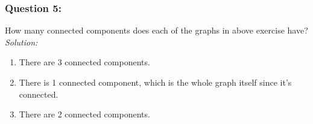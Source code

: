 \documentclass[a4paper]{article}
\begin{document}
	
	\subsubsection*{Question 5:}
	How many connected components does each of the graphs in above exercise have?\\
	\textit{Solution:}
	\begin{enumerate}[label = \alph*)]
	    \item 
	    There are 3 connected components.
	    \item 
	    There is 1 connected component, which is the whole graph itself since it's connected.
	    \item 
	    There are 2 connected components.
	\end{enumerate}

\end{document}
